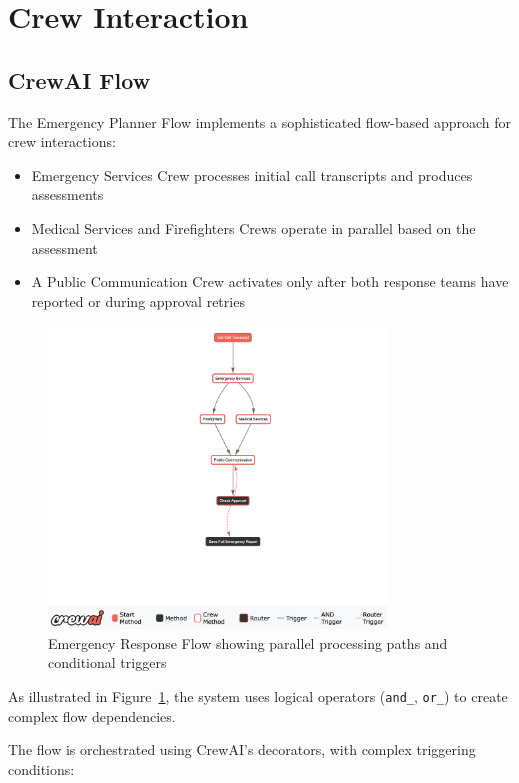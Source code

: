 \section{Crew Interaction}
\subsection{CrewAI Flow}
The Emergency Planner Flow implements a sophisticated flow-based approach for crew interactions:
\begin{itemize}
    \item Emergency Services Crew processes initial call transcripts and produces assessments
    \item Medical Services and Firefighters Crews operate in parallel based on the assessment
    \item A Public Communication Crew activates only after both response teams have reported or during approval retries
\end{itemize}

\begin{figure}[ht!]
    \centering
    \includegraphics[width=0.8\textwidth]{figures/coordination_flow.png}
    \caption{Emergency Response Flow showing parallel processing paths and conditional triggers}
    \label{fig:interaction}
\end{figure}

As illustrated in Figure~\ref{fig:interaction}, the system uses logical operators (\texttt{and\_}, \texttt{or\_}) to create complex flow dependencies.

The flow is orchestrated using CrewAI's decorators, with complex triggering conditions:

